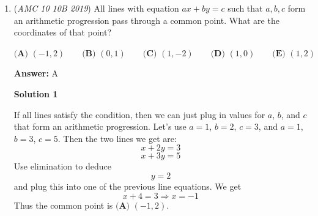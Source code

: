 \begin{enumerate}
 



\textbf{Solution 4}

We know that $40\%$ of the seniors play a musical instrument, and $30\%$ of the non-seniors do not. In addition, we know that the number of people who do not play a musical instrument is
 \[46.8\% \cdot 500 = 46.8 \cdot 5 = \frac{468}{2} = 234\]We can also conclude that $60\%$ of the seniors do not play an instrument, $70\%$ of the non seniors do play an instrument, and $500-234 = 266$ people do play an instrument.

 We can now set up the following equations, where $s$ is the number of seniors and $n$ is the number of non-seniors:
 \[0.3n + 0.6s = 234\]
 \[0.7n + 0.4s = 266\]By elimination, we get $1.5n$ to be equal to $330$. This means that $n = \frac{330}{1.5} = 220$.The answer is $70$ percent of $220$. This is equal to 
 \[0.7*220 = 7*22 = 154\]Therefore, the answer is $\boxed{\textbf{(B) } 154}$.

 



\textbf{Solution 5 (Faster Solution 1)}

Why don't we consider 100 students first, and multiply by 5 at the end. Then, say there are $s$ seniors and $n$ non-seniors.

 
 \[s+n = 100\]
 \[\frac{6}{10}s + \frac{3}{10}n = 46.8\]
 \[\implies 6s+3n = 468\]
 \[\implies 2s+n = 156\]

 and thus

 
 \[s = 56, n = 44\].

 We need $\frac{7}{10}$ of 5 times this result, meaning we wish to find $22 \cdot 7 = \boxed{154}$



	\item (\textit{AMC 10 10B 2019}) All lines with equation $ax+by=c$ such that $a,b,c$ form an arithmetic progression pass through a common point. What are the coordinates of that point?


 $\textbf{(A) } (-1,2) \qquad\textbf{(B) } (0,1) \qquad\textbf{(C) } (1,-2) \qquad\textbf{(D) } (1,0) \qquad\textbf{(E) } (1,2)$

 \textbf{Answer: }A



\textbf{Solution 1}

If all lines satisfy the condition, then we can just plug in values for $a$, $b$, and $c$ that form an arithmetic progression. Let's use $a=1$, $b=2$, $c=3$, and $a=1$, $b=3$, $c=5$. Then the two lines we get are: 
 \[x+2y=3\] 
 \[x+3y=5\]Use elimination to deduce 
 \[y = 2\] and plug this into one of the previous line equations. We get 
 \[x+4 = 3 \Rightarrow x=-1\] Thus the common point is $\boxed{\textbf{(A) } (-1,2)}$.


\end{enumerate}
